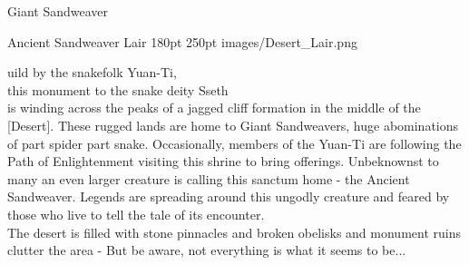 \documentclass[a4paper,openany,twoside,twocolumn]{book}
\begin{document}
\begin{DndMonster}[width=0.5\textwidth]{Giant Sandweaver}
    \DndMonsterAttack[
      name=Scythe Slashing,
      distance=melee, %
      mod=+6,
      reach=5,
      targets=one target,
      dmg={\DndDice{3d8 + 8}},
      dmg-type=piercing,
    ]
      
    \DndMonsterAttack[
      name=Web Shooter (Recharge 5-6),
      distance=ranged, %
      mod=+3,
      reach=20/60,
      targets=5 ft. radius,
      extra={Any target within the radius is restrained by webbing. As an action, the restrained target can make a DC 16 Strength check, bursting the web on a success. The webbing can also be attacked and destroyed (AC 10; HP 7; vulnerability to fire damage; immunity to bludgeoning, poison, and psychic damage)},
    ]
      
\end{DndMonster}


\MonsterBannerGraphic%
	{Ancient Sandweaver Lair}%
	{180pt}%
	{250pt}%
	{images/Desert_Lair.png}%
	{}%
	
\entryfont \noindent {}uild by the snakefolk Yuan-Ti,\\ this monument to the snake deity Sseth\\ is winding across the peaks of a jagged cliff formation in the middle of the [Desert]. These rugged lands are home to Giant Sandweavers, huge abominations of part spider part snake. Occasionally, members of the Yuan-Ti are following the Path of Enlightenment visiting this shrine to bring offerings. Unbeknownst to many an even larger creature is calling this sanctum home - the Ancient Sandweaver. Legends are spreading around this ungodly creature and feared by those who live to tell the tale of its encounter.\\
The desert is filled with stone pinnacles and broken obelisks and monument ruins clutter the area - But be aware, not everything is what it seems to be...
	
\end{document}
